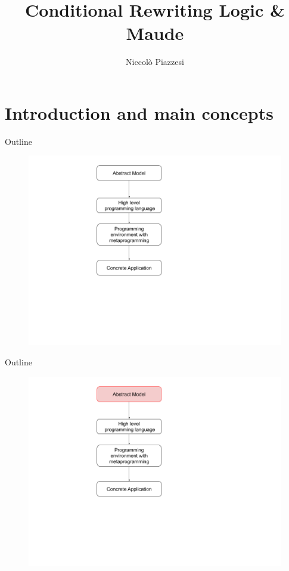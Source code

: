 \documentclass{beamer}
\title{Conditional Rewriting Logic \& Maude}
\author{Niccolò Piazzesi}
\institute{
    Università degli studi di Pisa
}
\begin{document}
\frame{\titlepage}

\section{Introduction and main concepts}
\begin{frame}{Outline}
    \begin{figure}
        \includegraphics[height=\textheight]{img/sec0.png}
    \end{figure}
\end{frame}
\begin{frame}{Outline}
    \begin{figure}
        \includegraphics[height=\textheight]{img/sec1.png}
    \end{figure}
\end{frame}
\end{document}
